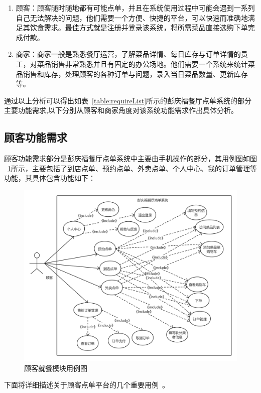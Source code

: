 \begin{enumerate}
    \item 顾客：顾客随时随地都有可能点单，并且在系统使用过程中可能会遇到一系列自己无法解决的问题，他们需要一个方便、快捷的平台，可以快速而准确地满足其饮食需求。最佳方式就是注册并登录该系统，将所需菜品直接选购下单完成付款。
    \item 商家：商家一般是熟悉餐厅运营，了解菜品详情、每日库存与订单详情的员工，对菜品销售非常熟悉并且有固定的办公场地。他们需要一个系统来统计菜品销售和库存，处理顾客的各种订单与问题，录入当日菜品数量、更新库存等。
  \end{enumerate}

通过以上分析可以得出如表~\ref{table:requireList}所示的彭庆福餐厅点单系统的部分主要功能需求,以下分别从顾客和商家角度对该系统功能需求作出具体分析。\\

\subsection{顾客功能需求}
顾客功能需求部分是彭庆福餐厅点单系统中主要由手机操作的部分，其用例图如图
~\ref{fig_customerCH3}所示，主要包括了到店点单、预约点单、外卖点单、个人中心、我的订单管理等功能，其具体包含功能如下：
\begin{figure}[htbp!]
  \centering
  \includegraphics[width=5in]{FIGs/chapter3/customer.pdf}
  \caption{顾客就餐模块用例图}\label{fig_customerCH3}
\end{figure}

下面将详细描述关于顾客点单平台的几个重要用例~\cite{ymh}。


